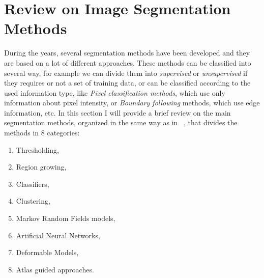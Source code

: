 \documentclass{standalone}
\begin{document}
	
	\section{Review on Image Segmentation Methods}

		During the years, several segmentation methods have been developed and they are based on a lot of different approaches. These methods can be classified into several way, for example we can divide them into \emph{supervised} or \emph{unsupervised} if they requires or not a set of training data, or can be classified according to the used information type, like \emph{Pixel classification methods}, which use only information about pixel intensity, or \emph{Boundary following} methods, which use edge information, etc. In this section I will provide a brief review on the main segmentation methods, organized in the same way as in ~\cite{ART:Pham}, that divides the methods in 8 categories: 
		\begin{enumerate}

			\item Thresholding, 

			\item Region growing,

			\item Classifiers,

			\item Clustering,

			\item Markov Random Fields models, 
	
			\item Artificial Neural Networks,

			\item Deformable Models,

			\item Atlas guided approaches.


		\end{enumerate}
\end{document}
